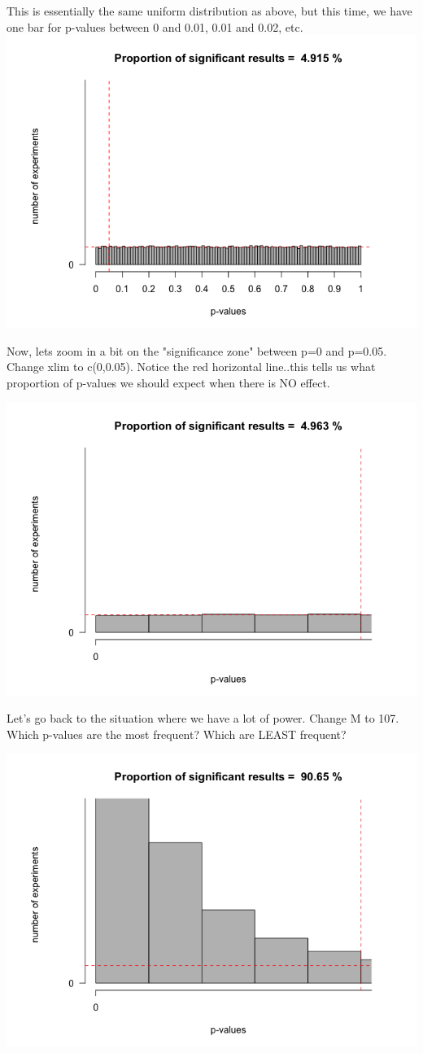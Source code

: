 \documentclass[11pt]{article}
\begin{document}
This is essentially the same uniform distribution as above, but this time, we have one bar for p-values between 0 and 0.01, 0.01 and 0.02, etc.
\includegraphics[width=.9\linewidth]{figures/lindley3.png}

Now, lets zoom in a bit on the "significance zone" between p=0 and p=0.05.  Change xlim to c(0,0.05).  Notice the red horizontal line..this tells us what proportion of p-values we should expect when there is NO effect.

\includegraphics[width=.9\linewidth]{figures/lindley4.png}

Let's go back to the situation where we have a lot of power.  Change M to 107. Which p-values are the most frequent?  Which are LEAST frequent?

\includegraphics[width=.9\linewidth]{figures/lindley5.png}
\end{document}
